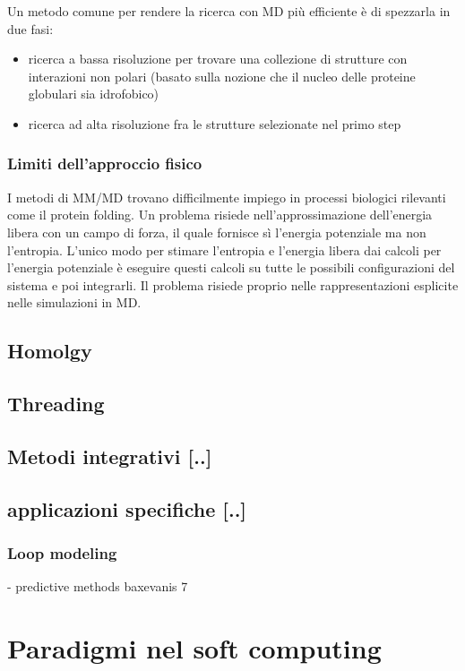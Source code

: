 \par Un metodo comune per rendere la ricerca con MD più efficiente è di spezzarla in due fasi:
\begin{itemize}
	\item ricerca a bassa risoluzione per trovare una collezione di strutture con interazioni non polari (basato sulla nozione che il nucleo delle proteine globulari sia idrofobico)
	\item ricerca ad alta risoluzione fra le strutture selezionate nel primo step
\end{itemize}

\subsubsection{Limiti dell'approccio fisico}
I metodi di MM/MD trovano difficilmente impiego in processi biologici rilevanti come il protein folding. Un problema risiede nell'approssimazione dell'energia libera con un campo di forza, il quale fornisce sì l'energia potenziale ma non l'entropia. L'unico modo per stimare l'entropia e l'energia libera dai calcoli per l'energia potenziale è eseguire questi calcoli su tutte le possibili configurazioni del sistema e poi integrarli. Il problema risiede proprio nelle rappresentazioni esplicite nelle simulazioni in MD.


\subsection{Homolgy}
\subsection{Threading}
\subsection{Metodi integrativi [..]}
\subsection{applicazioni specifiche [..]}
\subsubsection{Loop modeling}

- predictive methods
baxevanis 7

\section{Paradigmi nel soft computing}
